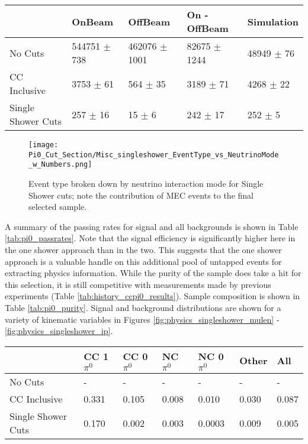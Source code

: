 \begin{table}[H] 
 \centering
 \begin{tabular}{| l | l | l | l | l |}
  \hline
   & OnBeam & OffBeam & On - OffBeam & Simulation \\ [0.1ex] \hline
No Cuts & 544751 $\pm$ 738 & 462076 $\pm$ 1001 & 82675 $\pm$ 1244 & 48949 $\pm$ 76 \\ 
CC Inclusive & 3753 $\pm$ 61 & 564 $\pm$ 35  & 3189 $\pm$ 71 & 4268 $\pm$ 22  \\ 
Single Shower Cuts & 257 $\pm$ 16 & 15 $\pm$ 6 & 242 $\pm$ 17 & 252 $\pm$ 5  \\ \hline
\end{tabular}
 \end{table}


\begin{figure}[H]
\centering
\texttt{[image: Pi0\_Cut\_Section/Misc\_singleshower\_EventType\_vs\_NeutrinoMode\_w\_Numbers.png]}
\caption{ Event type broken down by neutrino interaction mode for Single Shower cuts; note the contribution of MEC events to the final selected sample. }
\label{fig:physics_singleshower_inttype}
\end{figure}


\par A summary of the passing rates for signal and all backgrounds is shown in Table \ref{tab:pi0_passrates}.  Note that the signal efficiency is significantly higher here in the one shower approach than in the two. This suggests that the one shower approach is a valuable handle on this additional pool of untapped events for extracting physics information. While the purity of the sample does take a hit for this selection, it is still competitive with measurements made by previous experiments (Table \ref{tab:history_ccpi0_results}). Sample composition is shown in Table \ref{tab:pi0_purity}.  Signal and background distributions are shown for a variety of kinematic variables in Figures \ref{fig:physics_singleshower_mulen} - \ref{fig:physics_singleshower_ip}.


\begin{table}[H]
\centering
{}
 \begin{tabular}{| l | l | l |l|l|l|l|}
 \hline
 & CC 1$\pi^0$ & CC 0$\pi^0$ & NC $\pi^0$ & NC 0$\pi^0$ & Other & All \\ [0.1ex] \hline
No Cuts & - & - & - & - & - & -\\
CC Inclusive & 0.331 & 0.105 & 0.008 & 0.010 & 0.030 & 0.087 \\ 
Single Shower Cuts & 0.170 & 0.002 & 0.003 & 0.0003 & 0.009 & 0.005 \\ \hline
\end{tabular}
\end{table}

